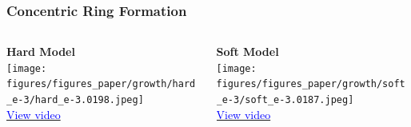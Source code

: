 \documentclass[10pt,t]{beamer}
\begin{document}
\begin{frame}
    \frametitle{Concentric Ring Formation}

    \begin{columns}[c]
        \begin{column}{0.48\textwidth}
            \centering
            \textbf{Hard Model}\\[0.3em]
            {\texttt{[image: figures/figures\_paper/growth/hard\_e-3/hard\_e-3.0198.jpeg]}}\\[0.6em]
            \small
            \href{https://home.cit.tum.de/~ler/bacteria/videos/hard_e-3.mp4}{\textcolor{blue}{{View video}}}
        \end{column}

        \begin{column}{0.48\textwidth}
            \centering
            \textbf{Soft Model}\\[0.3em]
            {\texttt{[image: figures/figures\_paper/growth/soft\_e-3/soft\_e-3.0187.jpeg]}}\\[0.6em]
            \small
            \href{https://home.cit.tum.de/~ler/bacteria/videos/soft_e-3.mp4}{\textcolor{blue}{{View video}}}
        \end{column}
    \end{columns}
\end{frame}
\end{document}
